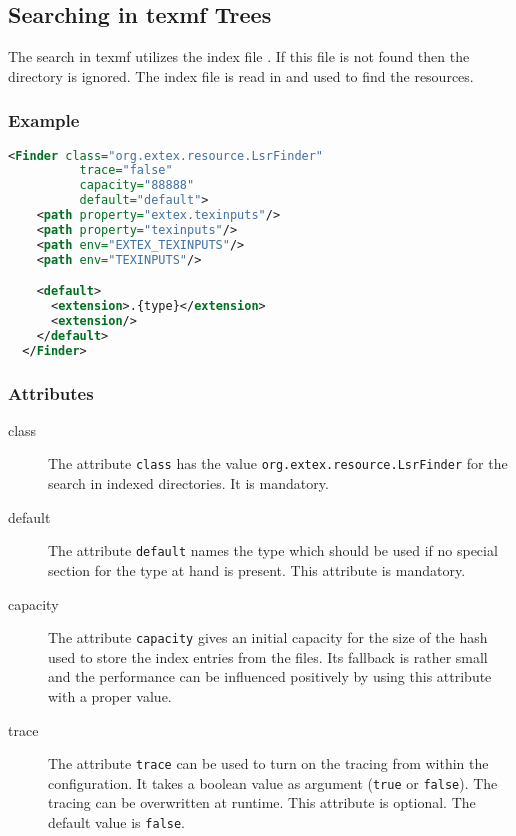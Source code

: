 \subsection{Searching in texmf Trees}

The search in texmf utilizes the index file . If this file
is not found then the directory is ignored. The index file 
is read in and used to find the resources.

\subsubsection*{Example}

\begin{lstlisting}[language=XML]
  <Finder class="org.extex.resource.LsrFinder"
          trace="false"
          capacity="88888"
          default="default">
    <path property="extex.texinputs"/>
    <path property="texinputs"/>
    <path env="EXTEX_TEXINPUTS"/>
    <path env="TEXINPUTS"/>

    <default>
      <extension>.{type}</extension>
      <extension/>
    </default>
  </Finder>
\end{lstlisting}

\subsubsection*{Attributes}
\begin{description}
\item[class] The attribute \texttt{class} has the value
  \texttt{org.extex.resource.LsrFinder} for the search in indexed
  directories. It is mandatory.
\item[default] The attribute \texttt{default} names the type which
  should be used if no special section for the type at hand is
  present. This attribute is mandatory.
\item[capacity] The attribute \texttt{capacity} gives an initial
  capacity for the size of the hash used to store the index entries
  from the  files. Its fallback is rather small and the
  performance can be influenced positively by using this attribute
  with a proper value.
\item[trace] The attribute \texttt{trace} can be used to turn on the
  tracing from within the configuration. It takes a boolean value as
  argument (\texttt{true} or \texttt{false}). The tracing can be
  overwritten at runtime. This attribute is optional. The default
  value is \texttt{false}.
\end{description}


